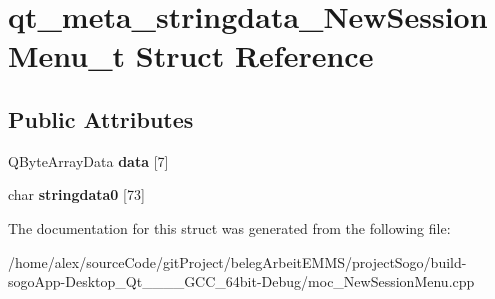 \hypertarget{structqt__meta__stringdata__NewSessionMenu__t}{\section{qt\-\_\-meta\-\_\-stringdata\-\_\-\-New\-Session\-Menu\-\_\-t Struct Reference}
\label{structqt__meta__stringdata__NewSessionMenu__t}
}
\subsection*{Public Attributes}
\begin{DoxyCompactItemize}
\item 
\hypertarget{structqt__meta__stringdata__NewSessionMenu__t_a8cd80b63b70708cae0946d6f92abc028}{Q\-Byte\-Array\-Data {\bfseries data} \mbox{[}7\mbox{]}}\label{structqt__meta__stringdata__NewSessionMenu__t_a8cd80b63b70708cae0946d6f92abc028}

\item 
\hypertarget{structqt__meta__stringdata__NewSessionMenu__t_abeecee1bc34c40caf760b2e1d84a28e3}{char {\bfseries stringdata0} \mbox{[}73\mbox{]}}\label{structqt__meta__stringdata__NewSessionMenu__t_abeecee1bc34c40caf760b2e1d84a28e3}

\end{DoxyCompactItemize}


The documentation for this struct was generated from the following file\-:\begin{DoxyCompactItemize}
\item 
/home/alex/source\-Code/git\-Project/beleg\-Arbeit\-E\-M\-M\-S/project\-Sogo/build-\/sogo\-App-\/\-Desktop\-\_\-\-Qt\-\_\-\_\-\_\-\_\-\-G\-C\-C\-\_\-64bit-\/\-Debug/moc\-\_\-\-New\-Session\-Menu.\-cpp\end{DoxyCompactItemize}
